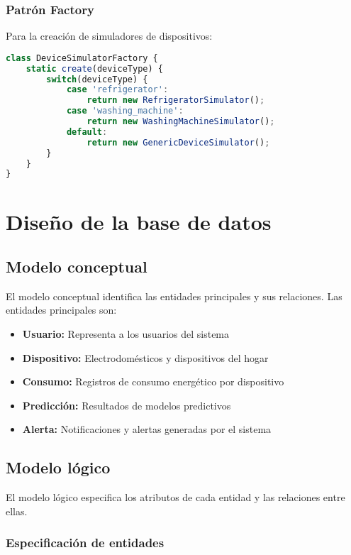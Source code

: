 \subsubsection{Patrón Factory}

Para la creación de simuladores de dispositivos:

\begin{lstlisting}[language=JavaScript, caption=Factory para simuladores de dispositivos]
class DeviceSimulatorFactory {
    static create(deviceType) {
        switch(deviceType) {
            case 'refrigerator':
                return new RefrigeratorSimulator();
            case 'washing_machine':
                return new WashingMachineSimulator();
            default:
                return new GenericDeviceSimulator();
        }
    }
}
\end{lstlisting}

\section{Diseño de la base de datos}

\subsection{Modelo conceptual}

El modelo conceptual identifica las entidades principales y sus relaciones. Las entidades principales son:

\begin{itemize}
    \item \textbf{Usuario:} Representa a los usuarios del sistema
    \item \textbf{Dispositivo:} Electrodomésticos y dispositivos del hogar
    \item \textbf{Consumo:} Registros de consumo energético por dispositivo
    \item \textbf{Predicción:} Resultados de modelos predictivos
    \item \textbf{Alerta:} Notificaciones y alertas generadas por el sistema
\end{itemize}

\subsection{Modelo lógico}

El modelo lógico especifica los atributos de cada entidad y las relaciones entre ellas.

\subsubsection{Especificación de entidades}

